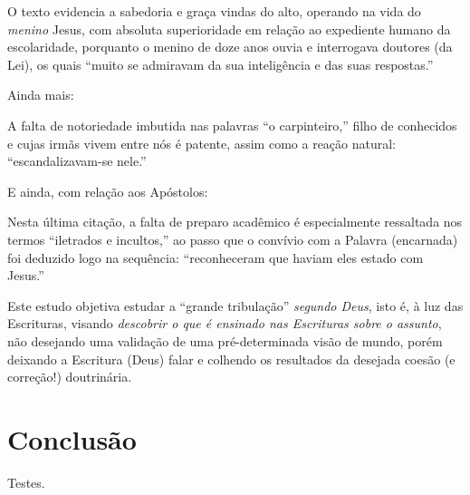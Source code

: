     O texto evidencia a sabedoria e graça vindas do alto, operando na vida do \emph{menino} Jesus, com absoluta superioridade em
    relação ao expediente humano da escolaridade, porquanto o menino de doze anos ouvia e  interrogava  doutores  (da  Lei),  os
    quais ``muito se admiravam da sua inteligência e das suas respostas.''

    Ainda mais:


    A falta de notoriedade imbutida nas palavras ``o carpinteiro,'' filho de conhecidos e cujas irmãs vivem entre nós é patente,
    assim como a reação natural: ``escandalizavam-se nele.''

    E ainda, com relação aos Apóstolos:


    Nesta última citação, a falta de preparo acadêmico é especialmente ressaltada nos termos ``iletrados e incultos,'' ao  passo
    que o convívio com a Palavra (encarnada) foi deduzido logo na sequência: ``reconheceram que haviam eles estado com Jesus.''

    Este estudo objetiva  estudar  a  ``grande  tribulação''  \emph{segundo  Deus},  isto  é,  à  luz  das  Escrituras,  visando
    \emph{descobrir o que é ensinado nas Escrituras sobre o assunto}, não desejando uma validação de uma  pré-determinada  visão
    de mundo, porém deixando a Escritura (Deus) falar e colhendo os resultados da desejada coesão (e correção!) doutrinária.



\section{Conclusão}

    Testes.

